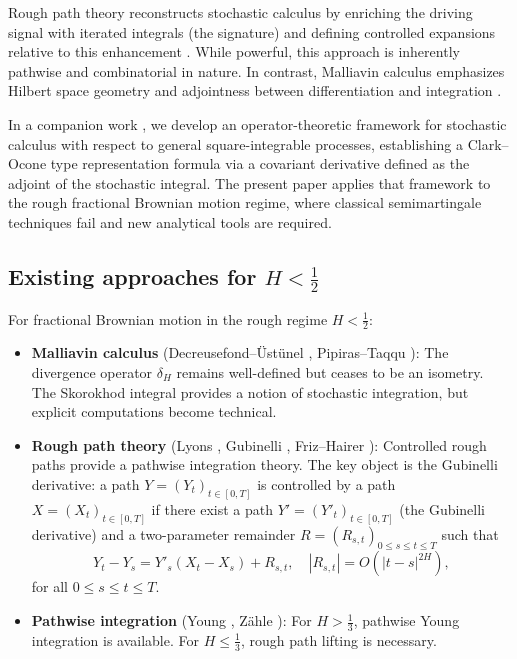 \documentclass[11pt,a4paper]{article}
\theoremstyle{plain}
\theoremstyle{definition}
\theoremstyle{remark}
\begin{document}
Rough path theory reconstructs stochastic calculus by enriching the driving signal with iterated integrals (the signature) and defining controlled expansions relative to this enhancement \cite{Gubinelli04}. While powerful, this approach is inherently pathwise and combinatorial in nature. In contrast, Malliavin calculus emphasizes Hilbert space geometry and adjointness between differentiation and integration \cite{Nualart06}.

In a companion work \cite{Fontes26}, we develop an operator-theoretic framework for stochastic calculus with respect to general square-integrable processes, establishing a Clark--Ocone type representation formula via a covariant derivative defined as the adjoint of the stochastic integral. The present paper applies that framework to the rough fractional Brownian motion regime, where classical semimartingale techniques fail and new analytical tools are required.

\subsection{Existing approaches for $H < \frac{1}{2}$}

For fractional Brownian motion in the rough regime $H < \frac{1}{2}$:

\begin{itemize}
\item \textbf{Malliavin calculus} (Decreusefond--\"Ust\"unel \cite{DU99}, Pipiras--Taqqu \cite{PT00}): The divergence operator $\delta_H$ remains well-defined but ceases to be an isometry. The Skorokhod integral provides a notion of stochastic integration, but explicit computations become technical.

\item \textbf{Rough path theory} (Lyons \cite{Lyons98}, Gubinelli \cite{Gubinelli04}, Friz--Hairer \cite{FH14}): Controlled rough paths provide a pathwise integration theory. The key object is the Gubinelli derivative: a path $Y = (Y_t)_{t \in [0,T]}$ is controlled by a path $X = (X_t)_{t \in [0,T]}$ if there exist a path $Y' = (Y'_t)_{t \in [0,T]}$ (the Gubinelli derivative) and a two-parameter remainder $R = (R_{s,t})_{0 \leq s \leq t \leq T}$ such that
\[
Y_t - Y_s = Y'_s(X_t - X_s) + R_{s,t}, \quad |R_{s,t}| = O(|t - s|^{2H}),
\]
for all $0 \leq s \leq t \leq T$.

\item \textbf{Pathwise integration} (Young \cite{Young36}, Z\"ahle \cite{Zahle98}): For $H > \frac{1}{3}$, pathwise Young integration is available. For $H \leq \frac{1}{3}$, rough path lifting is necessary.
\end{itemize}
\end{document}
